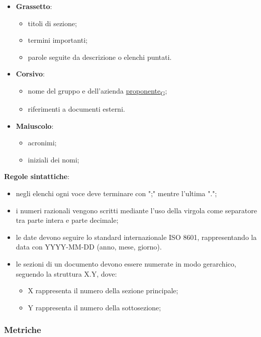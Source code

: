 \begin{itemize}
	\item \textbf{Grassetto}:
	      \begin{itemize}
		      \item titoli di sezione;
		      \item termini importanti;
		      \item parole seguite da descrizione o elenchi puntati.
	      \end{itemize}
	\item \textbf{Corsivo}:
	      \begin{itemize}
		      \item nome del gruppo e dell'azienda \href{https://7last.github.io/docs/pb/documentazione-interna/glossario\#proponente}{proponente\textsubscript{G}};
		      \item riferimenti a documenti esterni.
	      \end{itemize}
	\item \textbf{Maiuscolo}:
	      \begin{itemize}
		      \item acronimi;
		      \item iniziali dei nomi;
	      \end{itemize}
\end{itemize}
\newpage
\textbf{Regole sintattiche}:
\begin{itemize}
	\item negli elenchi ogni voce deve terminare con ";" mentre l'ultima ".";
	\item i numeri razionali vengono scritti mediante l'uso della virgola come separatore tra parte intera e parte decimale;
	\item le date devono seguire lo standard internazionale ISO 8601, rappresentando la data con YYYY-MM-DD (anno, mese, giorno).
	\item le sezioni di un documento devono essere numerate in modo gerarchico, seguendo la struttura X.Y, dove:
	      \begin{itemize}
		      \item X rappresenta il numero della sezione principale;
		      \item Y rappresenta il numero della sottosezione;
	      \end{itemize}
\end{itemize}

\subsubsection{Metriche}

